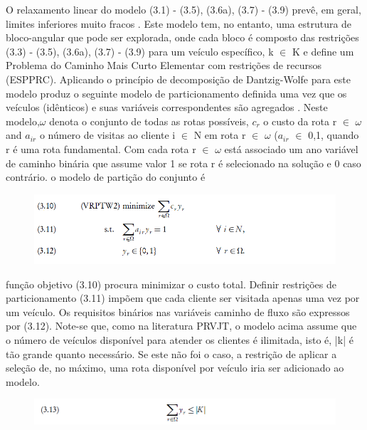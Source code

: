 O relaxamento linear do modelo (3.1) - (3.5), (3.6a), (3.7) - (3.9) prevê, em geral, limites inferiores muito fracos . Este modelo tem, no entanto, uma estrutura de bloco-angular que pode ser explorada, onde cada bloco é composto das restrições (3.3) - (3.5), (3.6a), (3.7) - (3.9) para um veículo específico, k $\in$ K e define um Problema do Caminho Mais Curto Elementar com restrições de recursos (ESPPRC). Aplicando o princípio de decomposição de Dantzig-Wolfe \cite{gendreau01} para este modelo produz o seguinte modelo de particionamento definida uma vez que os veículos (idênticos) e suas variáveis correspondentes são agregados \cite{gendreau10}. Neste modelo,$\omega$ denota o conjunto de todas as rotas possíveis, $c_r$ o custo da rota r $\in$ $\omega$ and $a_{ir}$ o número de visitas ao cliente i $\in$ N em rota r $\in$ $\omega$ ($a_{ir}$ $\in$ {0,1}, quando r é uma rota fundamental. Com cada rota r $\in$ $\omega$ está associado um ano variável de caminho binária que assume valor 1 se rota r é selecionado na solução e 0 caso contrário. o modelo de partição do conjunto é

\begin{figure}[ht!]
\centering
\includegraphics[scale=0.8]{figuras/math2.PNG}
\label{math2}
\end{figure}



função objetivo (3.10) procura minimizar o custo total. Definir restrições de particionamento (3.11) impõem que cada cliente ser visitada apenas uma vez por um veículo. Os requisitos binários nas variáveis caminho de fluxo são expressos por (3.12). Note-se que, como na literatura PRVJT, o modelo acima assume que o número de veículos disponível para atender os clientes é ilimitada, isto é, |k| é tão grande quanto necessário. Se este não foi o caso, a restrição de aplicar a seleção de, no máximo, uma rota disponível por veículo iria ser adicionado ao modelo.

\begin{figure}[ht!]
\centering
\includegraphics[scale=0.8]{figuras/math3.PNG}
\label{math3}
\end{figure}
 
